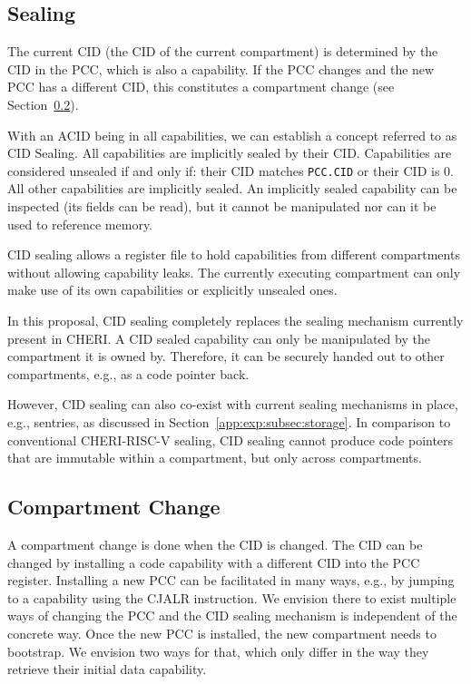 \subsection{Sealing}

The current CID (the CID of the current compartment) is determined by the CID in the PCC, which is also a capability.
If the PCC changes and the new PCC has a different CID, this constitutes a compartment change (see Section~\ref{app:exp:subsec:comp_change}).

With an ACID being in all capabilities, we can establish a concept referred to as CID Sealing.
All capabilities are implicitly sealed by their CID.
Capabilities are considered unsealed if and only if: their CID matches \texttt{PCC.CID} or their CID is 0. All other capabilities are implicitly sealed.
An implicitly sealed capability can be inspected (its fields can be read), but it cannot be manipulated nor can it be used to reference memory.

CID sealing allows a register file to hold capabilities from different compartments without allowing capability leaks.
The currently executing compartment can only make use of its own capabilities or explicitly unsealed ones.

In this proposal, CID sealing completely replaces the sealing mechanism currently present in CHERI.
A CID sealed capability can only be manipulated by the compartment it is owned by.
Therefore, it can be securely handed out to other compartments, e.g., as a code pointer back.

However, CID sealing can also co-exist with current sealing mechanisms in place, e.g., sentries, as discussed in Section~\ref{app:exp:subsec:storage}.
In comparison to conventional CHERI-RISC-V sealing, CID sealing cannot produce code pointers that are immutable within a compartment, but only across compartments.

\subsection{Compartment Change}
\label{app:exp:subsec:comp_change}

A compartment change is done when the CID is changed.
The CID can be changed by installing a code capability with a different CID into the PCC register.
Installing a new PCC can be facilitated in many ways, e.g., by jumping to a capability using the CJALR instruction.
We envision there to exist multiple ways of changing the PCC and the CID sealing mechanism is independent of the concrete way.
Once the new PCC is installed, the new compartment needs to bootstrap.
We envision two ways for that, which only differ in the way they retrieve their initial data capability.

